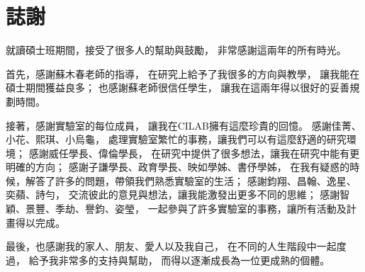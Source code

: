 \documentclass[class=NCU_thesis, crop=false]{standalone}
\begin{document}
\chapter{誌謝}

就讀碩士班期間，接受了很多人的幫助與鼓勵，
非常感謝這兩年的所有時光。

首先，感謝蘇木春老師的指導，
在研究上給予了我很多的方向與教學，
讓我能在碩士期間獲益良多；
也感謝蘇老師很信任學生，
讓我在這兩年得以很好的妥善規劃時間。

接著，感謝實驗室的每位成員，
讓我在CILAB擁有這麼珍貴的回憶。
感謝佳菁、小花、熙琪、小烏龜，
處理實驗室繁忙的事務，讓我們可以有這麼舒適的研究環境；
感謝威任學長、偉倫學長，
在研究中提供了很多想法，讓我在研究中能有更明確的方向；
感謝子謙學長、政育學長、映如學姊、書伃學姊，
在我有疑惑的時候，解答了許多的問題，帶領我們熟悉實驗室的生活；
感謝鈞翔、昌翰、逸星、奕蘋、詩勻，
交流彼此的意見與想法，讓我能激發出更多不同的思維；
感謝智穎、景豐、季劫、譽鈞、姿瑩，
一起參與了許多實驗室的事務，讓所有活動及計畫得以完成。

最後，也感謝我的家人、朋友、愛人以及我自己，
在不同的人生階段中一起度過，
給予我非常多的支持與幫助，
而得以逐漸成長為一位更成熟的個體。
\end{document}

